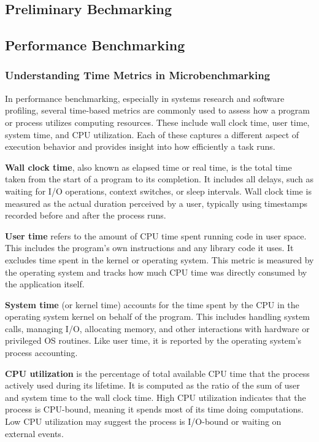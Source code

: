 \fontsize{12pt}{14pt} \selectfont
\begin{doublespace}
\appendix
\chapter{Preliminary Bechmarking}

\section{Performance Benchmarking}

\subsection{Understanding Time Metrics in Microbenchmarking}

In performance benchmarking, especially in systems research and software profiling, several time-based metrics are commonly used to assess how a program or process utilizes computing resources. These include wall clock time, user time, system time, and CPU utilization. Each of these captures a different aspect of execution behavior and provides insight into how efficiently a task runs.

\textbf{Wall clock time}, also known as elapsed time or real time, is the total time taken from the start of a program to its completion. It includes all delays, such as waiting for I/O operations, context switches, or sleep intervals. Wall clock time is measured as the actual duration perceived by a user, typically using timestamps recorded before and after the process runs.

\textbf{User time} refers to the amount of CPU time spent running code in user space. This includes the program’s own instructions and any library code it uses. It excludes time spent in the kernel or operating system. This metric is measured by the operating system and tracks how much CPU time was directly consumed by the application itself.

\textbf{System time} (or kernel time) accounts for the time spent by the CPU in the operating system kernel on behalf of the program. This includes handling system calls, managing I/O, allocating memory, and other interactions with hardware or privileged OS routines. Like user time, it is reported by the operating system’s process accounting.

\textbf{CPU utilization} is the percentage of total available CPU time that the process actively used during its lifetime. It is computed as the ratio of the sum of user and system time to the wall clock time. High CPU utilization indicates that the process is CPU-bound, meaning it spends most of its time doing computations. Low CPU utilization may suggest the process is I/O-bound or waiting on external events.


\end{doublespace}
